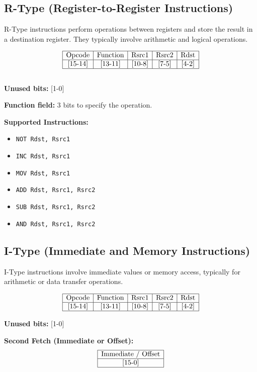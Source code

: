 \documentclass{report}
\begin{document}
\subsection*{R-Type (Register-to-Register Instructions)}
R-Type instructions perform operations between registers and store the result in a destination register. They typically involve arithmetic and logical operations.

\[
\begin{array}{|c|c|c|c|c|}
\hline
\text{Opcode} & \text{Function} & \text{Rsrc1} & \text{Rsrc2} & \text{Rdst} \\
\hline
\text{[15-14]} & \text{[13-11]} & \text{[10-8]} & \text{[7-5]} & \text{[4-2]} \\
\hline
\end{array}
\] \\

\textbf{Unused bits:} [1-0]

\textbf{Function field:} 3 bits to specify the operation.

\textbf{Supported Instructions:}
\begin{itemize}
    \item \texttt{NOT Rdst, Rsrc1}
    \item \texttt{INC Rdst, Rsrc1}
    \item \texttt{MOV Rdst, Rsrc1}
    \item \texttt{ADD Rdst, Rsrc1, Rsrc2}
    \item \texttt{SUB Rdst, Rsrc1, Rsrc2}
    \item \texttt{AND Rdst, Rsrc1, Rsrc2}
\end{itemize}

\subsection*{I-Type (Immediate and Memory Instructions)}
I-Type instructions involve immediate values or memory access, typically for arithmetic or data transfer operations.

\[
\begin{array}{|c|c|c|c|c|}
\hline
\text{Opcode} & \text{Function} & \text{Rsrc1} & \text{Rsrc2} & \text{Rdst} \\
\hline
\text{[15-14]} & \text{[13-11]} & \text{[10-8]} & \text{[7-5]} & \text{[4-2]} \\
\hline
\end{array}
\]

\textbf{Unused bits:} [1-0]

\textbf{Second Fetch (Immediate or Offset):}
\[
\begin{array}{|c|}
\hline
\text{Immediate / Offset} \\
\hline
\text{[15-0]} \\
\hline
\end{array}
\]
\end{document}
